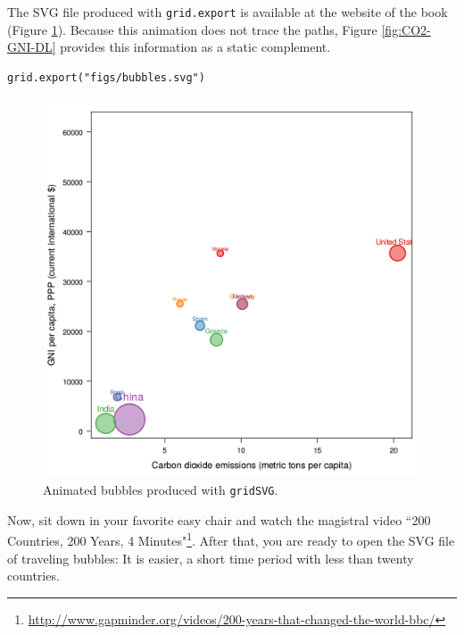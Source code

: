 The SVG file produced with \texttt{grid.export} is available at the website
of the book (Figure \ref{fig:bubblesSVG}). Because this animation does
not trace the paths, Figure \ref{fig:CO2-GNI-DL} provides this
information as a static complement.


\lstset{language=R,numbers=none}
\begin{lstlisting}
grid.export("figs/bubbles.svg")
\end{lstlisting}

\begin{figure}
  \centering
  \includegraphics[width=\textwidth]{figs/bubbles.png}
  \caption{Animated bubbles produced with \texttt{gridSVG}.}
  \label{fig:bubblesSVG}
\end{figure}

Now, sit down in your favorite easy chair and watch the magistral
video ``200 Countries, 200 Years, 4 Minutes"\footnote{\url{http://www.gapminder.org/videos/200-years-that-changed-the-world-bbc/}}. After that, you are
ready to open the SVG file of traveling bubbles: It is easier, a short
time period with less than twenty countries.
